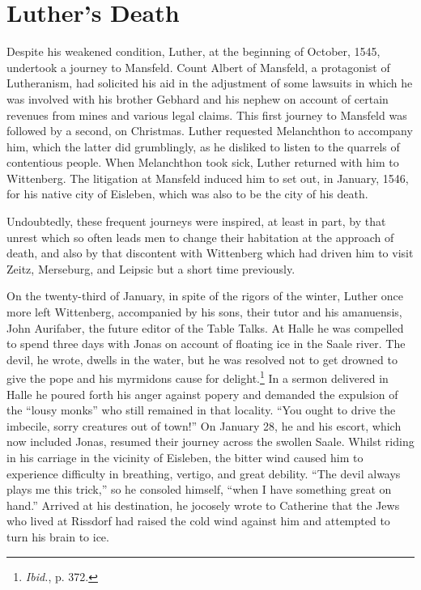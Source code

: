 \section{Luther’s Death}

Despite his weakened condition, Luther, at the beginning of October,
1545, undertook a journey to Mansfeld. Count Albert of
Mansfeld, a protagonist of Lutheranism, had solicited his aid in the
adjustment of some lawsuits in which he was involved with his
brother Gebhard and his nephew on account of certain revenues
from mines and various legal claims. This first journey to Mansfeld
was followed by a second, on Christmas. Luther requested Melanchthon to
accompany him, which the latter did grumblingly, as he
disliked to listen to the quarrels of contentious people. When Melanchthon
took sick, Luther returned with him to Wittenberg. The litigation
at Mansfeld induced him to set out, in January, 1546, for his
native city of Eisleben, which was also to be the city of his death.

Undoubtedly, these frequent journeys were inspired, at least in part,
by that unrest which so often leads men to change their habitation at
the approach of death, and also by that discontent with Wittenberg
which had driven him to visit Zeitz, Merseburg, and Leipsic but a
short time previously.

On the twenty-third of January, in spite of the rigors of the winter,
Luther once more left Wittenberg, accompanied by his sons, their
tutor and his amanuensis, John Aurifaber, the future editor of the
Table Talks. At Halle he was compelled to spend three days with
Jonas on account of floating ice in the Saale river. The devil, he wrote,
dwells in the water, but he was resolved not to get drowned to give
the pope and his myrmidons cause for delight.\footnote{\textit{Ibid.}, p. 372.}
 In a sermon delivered
in Halle he poured forth his anger against popery and demanded the
expulsion of the “lousy monks” who still remained in that locality.
“You ought to drive the imbecile, sorry creatures out of town!” On
January 28, he and his escort, which now included Jonas, resumed
their journey across the swollen Saale. Whilst riding in his carriage in
the vicinity of Eisleben, the bitter wind caused him to experience difficulty
in breathing, vertigo, and great debility. “The devil always
plays me this trick,” so he consoled himself, “when I have something
great on hand.” Arrived at his destination, he jocosely wrote to Catherine
that the Jews who lived at Rissdorf had raised the cold wind
against him and attempted to turn his brain to ice.

